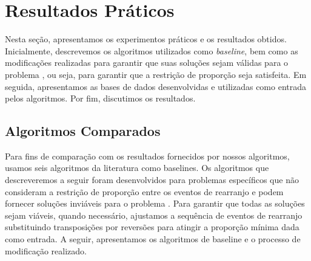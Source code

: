 \section{Resultados Práticos}

Nesta seção, apresentamos os experimentos práticos e os resultados obtidos. Inicialmente, descrevemos os algoritmos utilizados como \emph{baseline}, bem como as modificações realizadas para garantir que suas soluções sejam válidas para o problema \SbPRT{}, ou seja, para garantir que a restrição de proporção seja satisfeita. Em seguida, apresentamos as bases de dados desenvolvidas e utilizadas como entrada pelos algoritmos. Por fim, discutimos os resultados.

\subsection{Algoritmos Comparados}\label{subsection:BBECOZCK}

Para fins de comparação com os resultados fornecidos por nossos algoritmos, usamos seis algoritmos da literatura como baselines. Os algoritmos que descreveremos a seguir foram desenvolvidos para problemas específicos que não consideram a restrição de proporção entre os eventos de rearranjo e podem fornecer soluções inviáveis para o problema \SbPRT{}. Para garantir que todas as soluções sejam viáveis, quando necessário, ajustamos a sequência de eventos de rearranjo substituindo transposições por reversões para atingir a proporção mínima dada como entrada. A seguir, apresentamos os algoritmos de baseline e o processo de modificação realizado.


